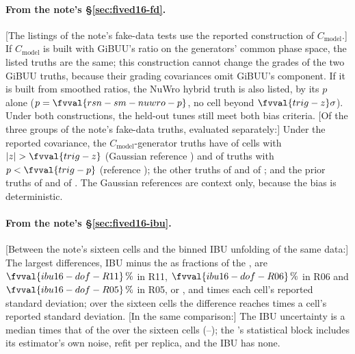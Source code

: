 \paragraph{From the note's \S\ref{sec:fived16-fd}.}
[The listings of the note's fake-data tests use the reported construction of $C_{\mathrm{model}}$.] If $C_{\mathrm{model}}$ is built with GiBUU's ratio on the generators' common phase space, the listed truths are the same; this construction cannot change the grades of the two GiBUU truths, because their grading covariances omit GiBUU's component. If it is built from smoothed ratios, the NuWro hybrid truth is also listed, by its $p$ alone ($p=\fvval{rsn-sm-nuwro-p}$, no cell beyond $\fvval{trig-z}\sigma$). Under both constructions, the held-out tunes still meet both bias criteria.
[Of the three groups of the note's fake-data truths, evaluated separately:] Under the reported covariance, the $C_{\mathrm{model}}$-generator truths have  of  cells with $|z|>\fvval{trig-z}$ (Gaussian reference ) and  of  truths with $p<\fvval{trig-p}$ (reference ); the other truths  of  and  of ; and the prior truths  of  and  of . The Gaussian references are context only, because the bias is deterministic.

\paragraph{From the note's \S\ref{sec:fived16-ibu}.}
[Between the note's sixteen cells and the binned IBU unfolding of the same data:] The largest differences, IBU minus the \estMultiD{} as fractions of the \estMultiD{}, are $\fvval{ibu16-dof-R11}\,\%$ in R11, $\fvval{ibu16-dof-R06}\,\%$ in R06 and $\fvval{ibu16-dof-R05}\,\%$ in R05, or ,  and  times each cell's reported standard deviation; over the sixteen cells the difference reaches  times a cell's reported standard deviation.
[In the same comparison:] The IBU uncertainty is a median  times that of the \estMultiD{} over the sixteen cells (--); the \estMultiD{}'s statistical block includes its estimator's own noise, refit per replica, and the IBU has none.


